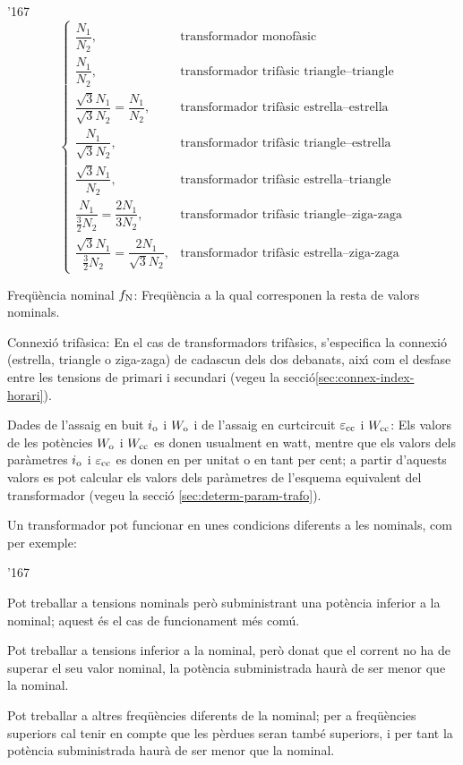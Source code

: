 \begin{dinglist}{'167}
\begin{equation}
\begin{cases}
        \dfrac{N_1}{N_2}, & \text{transformador monof\`{a}sic} \\[0.4cm]
        \dfrac{N_1}{N_2}, & \text{transformador trif\`{a}sic triangle--triangle} \\[0.4cm]
        \dfrac{\sqrt{3}N_1}{\sqrt{3}N_2} = \dfrac{N_1}{N_2}, & \text{transformador trif\`{a}sic estrella--estrella} \\[0.4cm]
        \dfrac{N_1}{\sqrt{3}N_2}, & \text{transformador trif\`{a}sic triangle--estrella} \\[0.4cm]
        \dfrac{\sqrt{3}N_1}{N_2}, & \text{transformador trif\`{a}sic estrella--triangle} \\[0.4cm]
        \dfrac{N_1}{\frac{3}{2}N_2} = \dfrac{2 N_1}{3 N_2}, & \text{transformador trif\`{a}sic triangle--ziga-zaga} \\[0.4cm]
        \dfrac{\sqrt{3}N_1}{\frac{3}{2}N_2} = \dfrac{2 N_1}{\sqrt{3} N_2}, & \text{transformador trif\`{a}sic estrella--ziga-zaga}
         \end{cases}
       \end{equation}
   \item Freq\"{u}\`{e}ncia nominal $f_\mathrm{N}$: Freq\"{u}\`{e}ncia a la qual corresponen la resta de valors nominals.
   \item Connexi\'{o} trif\`{a}sica: En el cas de transformadors trif\`{a}sics, s'especifica la connexi\'{o} (estrella, triangle o ziga-zaga) de cadascun dels dos debanats, aix\'{\i} com el desfase entre les tensions de primari i secundari (vegeu la secci\'{o}\vref{sec:connex-index-horari}).
   \item Dades de l'assaig en buit $i_\mathrm{o}$ i $W_\mathrm{o}$ i de l'assaig en curtcircuit $\varepsilon_\mathrm{cc}$ i $W_\mathrm{cc}$: Els valors de les pot\`{e}ncies $W_\mathrm{o}$ i $W_\mathrm{cc}$ es donen
usualment en watt, mentre que els valors dels par\`{a}metres $i_\mathrm{o}$
i $\varepsilon_\mathrm{cc}$ es donen en per unitat o en tant per cent; a partir d'aquests valors es pot calcular els valors dels par\`{a}metres de l'esquema equivalent del transformador  (vegeu la secci\'{o} \vref{sec:determ-param-trafo}).
\end{dinglist}

Un transformador pot funcionar en unes condicions diferents a les nominals, com per exemple:
\begin{dinglist}{'167}
   \item Pot treballar a tensions nominals per\`{o} subministrant una pot\`{e}ncia inferior a la nominal; aquest \'{e}s el cas de funcionament m\'{e}s com\'{u}.
   \item Pot treballar a tensions inferior a la nominal, per\`{o} donat que el corrent no ha de superar el seu valor nominal, la pot\`{e}ncia subministrada haur\`{a} de ser menor que la nominal.
   \item Pot treballar a altres freq\"{u}\`{e}ncies diferents de la nominal; per a freq\"{u}\`{e}ncies superiors cal tenir en compte que les p\`{e}rdues seran tamb\'{e} superiors, i per tant la pot\`{e}ncia subministrada haur\`{a} de ser menor que la nominal.
\end{dinglist}

